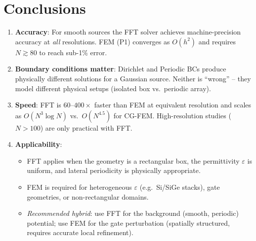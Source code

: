 \documentclass[11pt,a4paper]{article}
\begin{document}
\section{Conclusions}

\begin{enumerate}
  \item \textbf{Accuracy}: For smooth sources the FFT solver achieves
        machine-precision accuracy at \emph{all} resolutions.
        FEM (P1) converges as $O(h^2)$ and requires $N\gtrsim80$ to
        reach sub-1\% error.

  \item \textbf{Boundary conditions matter}: Dirichlet and Periodic BCs
        produce physically different solutions for a Gaussian source.
        Neither is ``wrong'' -- they model different physical setups
        (isolated box vs.\ periodic array).

  \item \textbf{Speed}: FFT is $60\text{--}400\times$ faster than FEM at
        equivalent resolution and scales as $O(N^3\log N)$ vs.\
        $O(N^{4.5})$ for CG-FEM.  High-resolution studies
        ($N>100$) are only practical with FFT.

  \item \textbf{Applicability}:
        \begin{itemize}
          \item FFT applies when the geometry is a rectangular box,
                the permittivity $\varepsilon$ is uniform, and lateral
                periodicity is physically appropriate.
          \item FEM is required for heterogeneous $\varepsilon$
                (e.g.\ Si/SiGe stacks), gate geometries, or
                non-rectangular domains.
          \item \emph{Recommended hybrid}: use FFT for the background
                (smooth, periodic) potential; use FEM for the gate
                perturbation (spatially structured, requires accurate
                local refinement).
        \end{itemize}
\end{enumerate}
\end{document}
